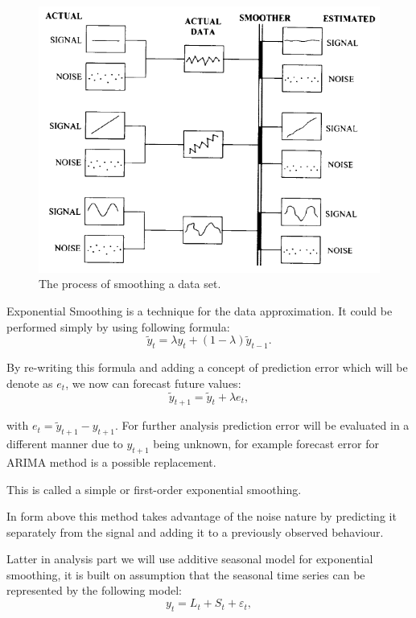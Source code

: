 \documentclass[12pt,a4paper]{article}
\theoremstyle{myplain}
\numberwithin{equation}{section}
\begin{document}
\begin{figure}
\includegraphics[scale=0.9]{Process_of_smoothing}
\caption{The process of smoothing a data set.}
\end{figure}

Exponential Smoothing is a technique for the data approximation. It could be performed simply by using following formula:
\begin{equation}
\tilde{y}_t = \lambda y_t + (1 - \lambda)\tilde{y}_{t - 1}.
\end{equation}

By re-writing this formula and adding a concept of prediction error which will be denote as $ e_t $, we now can forecast future values:
\begin{equation}
\tilde{y}_{t + 1} = \tilde{y}_t + \lambda e_{t},
\end{equation}

with $ e_t = \tilde{y}_{t + 1} - y_{t+1} $. For further analysis prediction error will be evaluated in a different manner due to $ y_{t + 1} $ being unknown, for example forecast error for ARIMA method is a possible replacement.

This is called a simple or first-order exponential smoothing.

In form above this method takes advantage of the noise nature by predicting it separately from the signal and adding it to a previously observed behaviour.

Latter in analysis part we will use additive seasonal model for exponential smoothing, it is built on assumption that the seasonal time series can be represented by the following model:
\begin{equation}
y_t = L_t + S_t + \varepsilon_t,
\end{equation}
\end{document}
